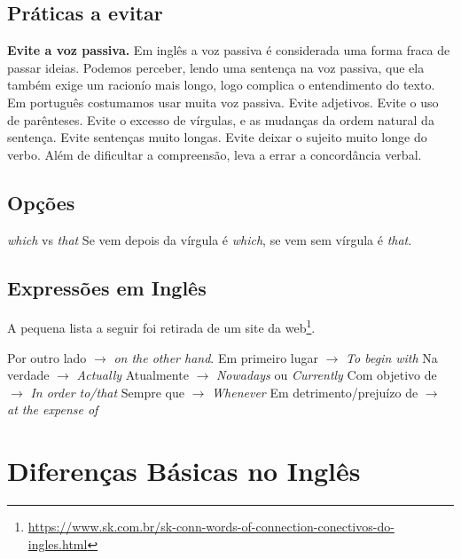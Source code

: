 \documentclass{article}
\begin{document}
\subsection{Práticas a evitar}
\begin{outline}
\1 \textbf{Evite a voz passiva.}
\2 Em inglês a voz passiva é considerada uma forma fraca de passar ideias. Podemos perceber, lendo uma sentença na voz passiva, que ela também exige um racionío mais longo, logo complica o entendimento do texto. Em português costumamos usar muita voz passiva. 
\1 Evite adjetivos.
\1 Evite o uso de parênteses.
\1 Evite o excesso de vírgulas, e as mudanças da ordem natural da sentença.
\1 Evite sentenças muito longas.
\1 Evite deixar o sujeito muito longe do verbo.
\2 Além de dificultar a compreensão, leva a errar a concordância verbal.
\end{outline}

\subsection{Opções}

\begin{outline}
\1 \textit{which} vs \textit{that}
\2 Se vem depois da vírgula é \textit{which}, se vem sem vírgula é \textit{that}.
\end{outline}

\subsection{Expressões em Inglês}

 A pequena lista a seguir foi retirada de um site da web\footnote{\url{https://www.sk.com.br/sk-conn-words-of-connection-conectivos-do-ingles.html}}.

\begin{outline}
    \1 Por outro lado $\rightarrow$ \textit{on the other hand}.
    \1 Em primeiro lugar $\rightarrow$ \textit{To begin with}
    \1 Na verdade    $\rightarrow$ \textit{Actually}
    \1 Atualmente    $\rightarrow$ \textit{Nowadays} ou \textit{Currently}
    \1 Com objetivo de $\rightarrow$ \textit{In order to/that}
    \1 Sempre que $\rightarrow$ \textit{Whenever}
    \1 Em detrimento/prejuízo de $\rightarrow$ \textit{at the expense of}
\end{outline}


\section{Diferenças Básicas no Inglês}
\end{document}
